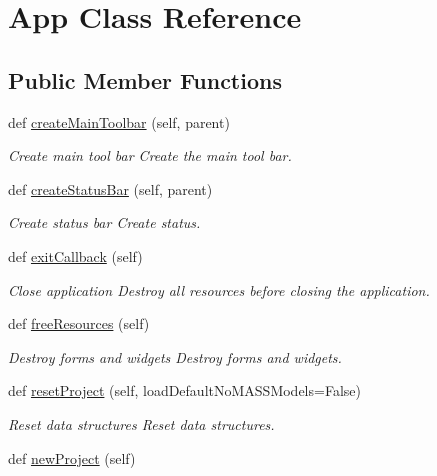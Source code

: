\hypertarget{class_no_m_a_s_s___g_u_i_1_1_app}{}\section{App Class Reference}
\label{class_no_m_a_s_s___g_u_i_1_1_app}
\subsection*{Public Member Functions}
\begin{DoxyCompactItemize}
\item 
def \hyperlink{class_no_m_a_s_s___g_u_i_1_1_app_aa2c521b1919bad17bbd98c40cf56a7d4}{create\+Main\+Toolbar} (self, parent)
\begin{DoxyCompactList}\small\item\em Create main tool bar Create the main tool bar. \end{DoxyCompactList}\item 
def \hyperlink{class_no_m_a_s_s___g_u_i_1_1_app_ab88dd8d1817c2c1026001f3aa25ac355}{create\+Status\+Bar} (self, parent)
\begin{DoxyCompactList}\small\item\em Create status bar Create status. \end{DoxyCompactList}\item 
def \hyperlink{class_no_m_a_s_s___g_u_i_1_1_app_a49c1ac8804dc14c695793e23549756d7}{exit\+Callback} (self)
\begin{DoxyCompactList}\small\item\em Close application Destroy all resources before closing the application. \end{DoxyCompactList}\item 
def \hyperlink{class_no_m_a_s_s___g_u_i_1_1_app_a3fbca20a2bdf6d712baf7816a11c3585}{free\+Resources} (self)
\begin{DoxyCompactList}\small\item\em Destroy forms and widgets Destroy forms and widgets. \end{DoxyCompactList}\item 
def \hyperlink{class_no_m_a_s_s___g_u_i_1_1_app_abeee64cfa5bb453539b747213c594bbc}{reset\+Project} (self, load\+Default\+No\+M\+A\+S\+S\+Models=False)
\begin{DoxyCompactList}\small\item\em Reset data structures Reset data structures. \end{DoxyCompactList}\item 
def \hyperlink{class_no_m_a_s_s___g_u_i_1_1_app_ae1e47083122a73b7f4ad716b42f165a7}{new\+Project} (self)

\end{DoxyCompactItemize}
